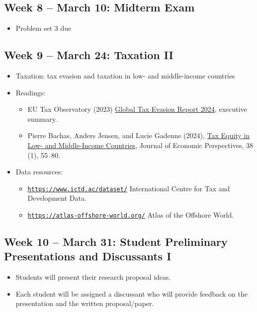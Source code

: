 \documentclass[11pt]{article}
\begin{document}
\subsection*{Week 8 -- March 10: Midterm Exam}
\begin{itemize}
    \item Problem set 3 due
\end{itemize}

\subsection*{Week 9 -- March 24: Taxation II}
\begin{itemize}
    \setlength{\itemsep}{0em}
    \item Taxation: tax evasion and taxation in low- and middle-income countries
    \item Readings:
    \begin{itemize}
        \item EU Tax Observatory (2023) \href{https://www.taxobservatory.eu//www-site/uploads/2023/10/report.pdf}{Global Tax Evasion Report 2024}, executive summary.
        \item Pierre Bachas, Anders Jensen, and Lucie Gadenne (2024), \href{https://www.aeaweb.org/articles?id=10.1257/jep.38.1.55}{Tax Equity in Low- and Middle-Income Countries}, Journal of Economic Perspectives, 38 (1), 55--80.
    \end{itemize}
    \item Data resources:
    \begin{itemize}
        \item \href{https://www.ictd.ac/dataset/}{\nolinkurl{https://www.ictd.ac/dataset/}} International Centre for Tax and Development Data.
        \item \href{https://atlas-offshore-world.org/}{\nolinkurl{https://atlas-offshore-world.org/}} Atlas of the Offshore World.
    \end{itemize}
\end{itemize}
\subsection*{Week 10 -- March 31: Student Preliminary Presentations and Discussants I}

\begin{itemize}
    \setlength{\itemsep}{0em}
    \item Students will present their research proposal ideas.
    \item Each student will be assigned a discussant who will provide feedback on the presentation and the written proposal/paper.
\end{itemize}
\end{document}

